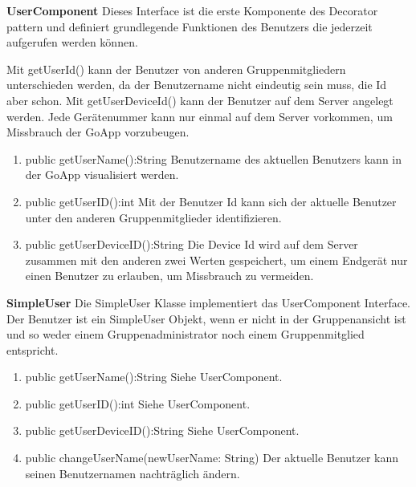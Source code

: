 \textbf{UserComponent}
Dieses Interface ist die erste Komponente des Decorator pattern und definiert grundlegende Funktionen des Benutzers die jederzeit aufgerufen werden können. 

Mit getUserId() kann der Benutzer von anderen Gruppenmitgliedern unterschieden werden, da der Benutzername nicht eindeutig sein muss, die Id aber schon.
Mit getUserDeviceId() kann der Benutzer auf dem Server angelegt werden. Jede Gerätenummer kann nur einmal auf dem Server vorkommen, um Missbrauch der GoApp vorzubeugen.
\begin{enumerate}
	\item public getUserName():String
	Benutzername des aktuellen Benutzers kann in der GoApp visualisiert werden.
	\item public getUserID():int
	Mit der Benutzer Id kann sich der aktuelle Benutzer unter den anderen Gruppenmitglieder identifizieren.
	\item public getUserDeviceID():String
	Die Device Id wird auf dem Server zusammen mit den anderen zwei Werten gespeichert, um einem Endgerät nur einen Benutzer zu erlauben, um Missbrauch zu vermeiden.
\end{enumerate}

\textbf{SimpleUser}
Die SimpleUser Klasse implementiert das UserComponent Interface. Der Benutzer ist ein SimpleUser Objekt, wenn er nicht in der Gruppenansicht ist und so weder einem Gruppenadministrator noch einem Gruppenmitglied entspricht.
\begin{enumerate}
	\item public getUserName():String
	Siehe UserComponent.
	\item public getUserID():int
	Siehe UserComponent.
	\item public getUserDeviceID():String
	Siehe UserComponent.
	\item public changeUserName(newUserName: String)
	Der aktuelle Benutzer kann seinen Benutzernamen nachträglich ändern.
\end{enumerate}

